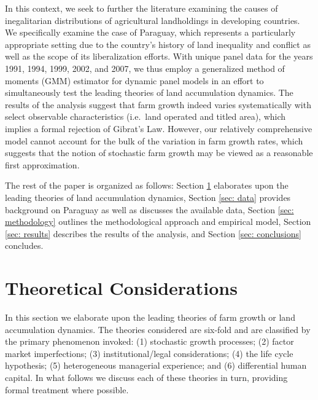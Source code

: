 \documentclass[english]{article}
\begin{document}
In this context, we seek to further the literature examining the causes of 
inegalitarian distributions of agricultural landholdings in developing 
countries.
We specifically examine the case of Paraguay, which represents a particularly 
appropriate setting due to the country's history of land inequality and conflict 
as well as the scope of its liberalization efforts.
With unique panel data for the years 1991, 1994, 1999, 2002, and 2007, we thus 
employ a generalized method of moments (GMM) estimator for dynamic panel 
models in an effort to simultaneously test the leading theories of land 
accumulation dynamics.
The results of the analysis suggest that farm growth indeed varies 
systematically with select observable characteristics 
(i.e.\ land operated and titled area), which implies a formal rejection of 
Gibrat's Law. 
However, our relatively comprehensive model cannot account for the bulk of 
the variation in farm growth rates, which suggests that the notion of 
stochastic farm growth may be viewed as a reasonable first approximation.

The rest of the paper is organized as follows: Section \ref{sec: theories} 
elaborates upon the leading theories of land accumulation dynamics, 
Section \ref{sec: data} provides background on Paraguay as well as discusses 
the available data, Section \ref{sec: methodology} outlines the methodological 
approach and empirical model, Section \ref{sec: results} describes the results 
of the analysis, and Section \ref{sec: conclusions} concludes.


\section{Theoretical Considerations}
\label{sec: theories}

In this section we elaborate upon the leading theories of farm growth or 
land accumulation dynamics.  
The theories considered are six-fold and are classified by the primary 
phenomenon invoked: (1) stochastic growth processes; 
(2) factor market imperfections; (3) institutional/legal considerations; 
(4) the life cycle hypothesis; (5) heterogeneous managerial experience; and 
(6) differential human capital. 
In what follows we discuss each of these theories in turn, providing formal
treatment where possible.
\end{document}
